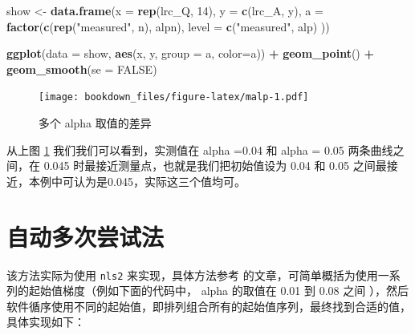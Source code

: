 \documentclass[]{krantz}
\makeatletter
\newenvironment{Shaded}{\begin{snugshade}}{\end{snugshade}}
\newcommand{\KeywordTok}[1]{\textcolor[rgb]{0.13,0.29,0.53}{\textbf{#1}}}
\newcommand{\DataTypeTok}[1]{\textcolor[rgb]{0.13,0.29,0.53}{#1}}
\newcommand{\DecValTok}[1]{\textcolor[rgb]{0.00,0.00,0.81}{#1}}
\newcommand{\StringTok}[1]{\textcolor[rgb]{0.31,0.60,0.02}{#1}}
\newcommand{\OtherTok}[1]{\textcolor[rgb]{0.56,0.35,0.01}{#1}}
\newcommand{\OperatorTok}[1]{\textcolor[rgb]{0.81,0.36,0.00}{\textbf{#1}}}
\newcommand{\NormalTok}[1]{#1}
\newenvironment{kframe}{%
\medskip{}
\setlength{\fboxsep}{.8em}
 \def\at@end@of@kframe{}%
 \ifinner\ifhmode%
  \def\at@end@of@kframe{\end{minipage}}%
  \begin{minipage}{\columnwidth}%
 \fi\fi%
 \def\FrameCommand##1{\hskip\@totalleftmargin \hskip-\fboxsep
 \colorbox{shadecolor}{##1}\hskip-\fboxsep
     \hskip-\linewidth \hskip-\@totalleftmargin \hskip\columnwidth}%
 \MakeFramed {\advance\hsize-\width
   \@totalleftmargin\z@ \linewidth\hsize
   \@setminipage}}%
 {\par\unskip\endMakeFramed%
 \at@end@of@kframe}
\renewenvironment{Shaded}{\begin{kframe}}{\end{kframe}}
\theoremstyle{definition}
\theoremstyle{definition}
\theoremstyle{definition}
\theoremstyle{remark}
\makeatother
\begin{document}
\begin{Shaded}
\begin{Highlighting}[]
\NormalTok{show <-}\StringTok{ }\KeywordTok{data.frame}\NormalTok{(}\DataTypeTok{x =} \KeywordTok{rep}\NormalTok{(lrc_Q, }\DecValTok{14}\NormalTok{),}
           \DataTypeTok{y =} \KeywordTok{c}\NormalTok{(lrc_A, y), }
           \DataTypeTok{a =} \KeywordTok{factor}\NormalTok{(}\KeywordTok{c}\NormalTok{(}\KeywordTok{rep}\NormalTok{(}\StringTok{"measured"}\NormalTok{, n), alpn),}
           \DataTypeTok{level =} \KeywordTok{c}\NormalTok{(}\StringTok{"measured"}\NormalTok{, alp)}
\NormalTok{             ))}

\KeywordTok{ggplot}\NormalTok{(}\DataTypeTok{data =}\NormalTok{ show, }\KeywordTok{aes}\NormalTok{(x, y, }\DataTypeTok{group =}\NormalTok{ a, }\DataTypeTok{color=}\NormalTok{a)) }\OperatorTok{+}\StringTok{ }
\StringTok{  }\KeywordTok{geom_point}\NormalTok{() }\OperatorTok{+}\StringTok{ }
\StringTok{  }\KeywordTok{geom_smooth}\NormalTok{(}\DataTypeTok{se =} \OtherTok{FALSE}\NormalTok{) }
\end{Highlighting}
\end{Shaded}

\begin{figure}
\centering
\texttt{[image: bookdown\_files/figure-latex/malp-1.pdf]}
\caption{\label{fig:malp}多个 alpha 取值的差异}
\end{figure}

从上图 \ref{fig:malp} 我们我们可以看到，实测值在 alpha =0.04 和 alpha =
0.05 两条曲线之间，在 0.045 时最接近测量点，也就是我们把初始值设为 0.04
和 0.05 之间最接近，本例中可认为是0.045，实际这三个值均可。

\section{自动多次尝试法}\label{mult_try}

该方法实际为使用 \texttt{nls2} 来实现，具体方法参考 \citet{nls2}
的文章，可简单概括为使用一系列的起始值梯度（例如下面的代码中， alpha
的取值在 0.01 到 0.08 之间
），然后软件循序使用不同的起始值，即排列组合所有的起始值序列，最终找到合适的值，具体实现如下：
\end{document}
